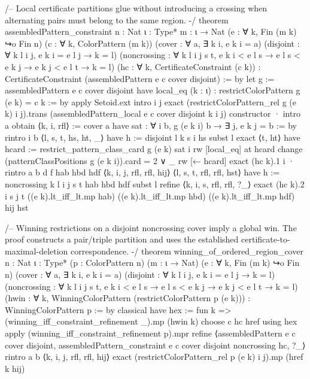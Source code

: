 \documentclass[11pt,reqno]{amsart}
\theoremstyle{definition}
\begin{document}
\begin{LeanCode}
/-- Local certificate partitions glue without introducing a crossing when
alternating pairs must belong to the same region. -/
theorem assembledPattern_constraint {n : Nat} {ι : Type*} {m : ι → Nat}
    (e : ∀ k, Fin (m k) ↪o Fin n) (c : ∀ k, ColorPattern (m k))
    (cover : ∀ a, ∃ k i, e k i = a)
    (disjoint : ∀ k l i j, e k i = e l j → k = l)
    (noncrossing : ∀ k l i j s t,
      e k i < e l s → e l s < e k j → e k j < e l t → k = l)
    (hc : ∀ k, CertificateConstraint (c k)) :
    CertificateConstraint (assembledPattern e c cover disjoint) := by
  let g := assembledPattern e c cover disjoint
  have local_eq (k : ι) : restrictColorPattern g (e k) = c k := by
    apply Setoid.ext
    intro i j
    exact (restrictColorPattern_rel g (e k) i j).trans
      (assembledPattern_local e c cover disjoint k i j)
  constructor
  · intro a
    obtain ⟨k, i, rfl⟩ := cover a
    have sat : ∀ i b, g (e k i) b → ∃ j, e k j = b := by
      rintro i b ⟨l, s, t, hs, ht, _⟩
      have h := disjoint l k s i hs
      subst l
      exact ⟨t, ht⟩
    have hcard := restrict_pattern_class_card g (e k) sat i
    rw [local_eq] at hcard
    change (patternClassPositions g (e k i)).card = 2 ∨ _
    rw [← hcard]
    exact (hc k).1 i
  · rintro a b d f hab hbd hdf ⟨k, i, j, rfl, rfl, hij⟩
      ⟨l, s, t, rfl, rfl, hst⟩
    have h := noncrossing k l i j s t hab hbd hdf
    subst l
    refine ⟨k, i, s, rfl, rfl, ?_⟩
    exact (hc k).2 i s j t ((e k).lt_iff_lt.mp hab)
      ((e k).lt_iff_lt.mp hbd) ((e k).lt_iff_lt.mp hdf) hij hst

/-- Winning restrictions on a disjoint noncrossing cover imply a global win.
The proof constructs a pair/triple partition and uses the established
certificate-to-maximal-deletion correspondence. -/
theorem winning_of_ordered_region_cover {n : Nat} {ι : Type*}
    (p : ColorPattern n) (m : ι → Nat) (e : ∀ k, Fin (m k) ↪o Fin n)
    (cover : ∀ a, ∃ k i, e k i = a)
    (disjoint : ∀ k l i j, e k i = e l j → k = l)
    (noncrossing : ∀ k l i j s t,
      e k i < e l s → e l s < e k j → e k j < e l t → k = l)
    (hwin : ∀ k, WinningColorPattern (restrictColorPattern p (e k))) :
    WinningColorPattern p := by
  classical
  have hex := fun k => (winning_iff_constraint_refinement _).mp (hwin k)
  choose c hc href using hex
  apply (winning_iff_constraint_refinement p).mpr
  refine ⟨assembledPattern e c cover disjoint,
    assembledPattern_constraint e c cover disjoint noncrossing hc, ?_⟩
  rintro a b ⟨k, i, j, rfl, rfl, hij⟩
  exact (restrictColorPattern_rel p (e k) i j).mp (href k hij)


\end{LeanCode}
\end{document}
